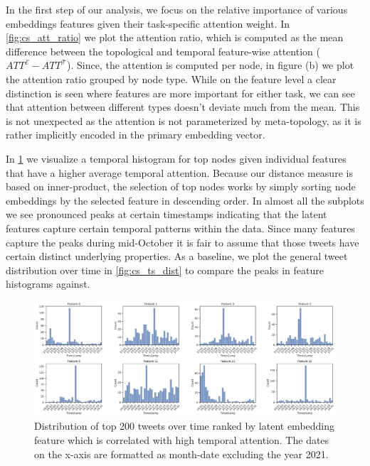 In the first step of our analysis, we focus on the relative importance of various embeddings features given their task-specific attention weight.
In \cref{fig:cs_att_ratio} we plot the attention ratio, which is computed as the mean difference between the topological and temporal feature-wise attention ($ATT^{\mathcal{E}} - ATT^{\mathcal{T}}$).
Since, the attention is computed per node, in figure (b) we plot the attention ratio grouped by node type.
While on the feature level a clear distinction is seen where features are more important for either task, we can see that attention between different types doesn't deviate much from the mean.
This is not unexpected as the attention is not parameterized by meta-topology, as it is rather implicitly encoded in the primary embedding vector.

In \cref{fig:cs_tempo_feat_hist} we visualize a temporal histogram for top nodes given individual features that have a higher average temporal attention.
Because our distance measure is based on inner-product, the selection of top nodes works by simply sorting node embeddings by the selected feature in descending order.
In almost all the subplots we see pronounced peaks at certain timestamps indicating that the latent features capture certain temporal patterns within the data.
Since many features capture the peaks during mid-October it is fair to assume that those tweets have certain distinct underlying properties. 
As a baseline, we plot the general tweet distribution over time in \cref{fig:cs_ts_dist} to compare the peaks in feature histograms against.

\begin{figure}[!ht]
\centering
\includegraphics[width=\columnwidth]{resources/figs/case_study/05_att_tempo_hist.pdf}
\caption{
    Distribution of top 200 tweets over time ranked by latent embedding feature which is correlated with high temporal attention.
    The dates on the x-axis are formatted as month-date excluding the year 2021.
}
\label{fig:cs_tempo_feat_hist}
\end{figure}

